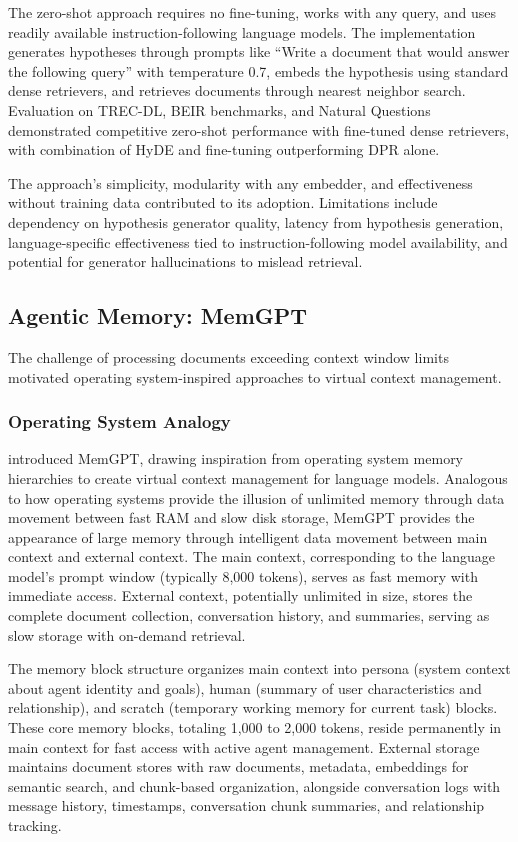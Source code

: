 \documentclass[11pt,letterpaper]{article}
\begin{document}
The zero-shot approach requires no fine-tuning, works with any query, and uses readily available instruction-following language models. The implementation generates hypotheses through prompts like ``Write a document that would answer the following query'' with temperature 0.7, embeds the hypothesis using standard dense retrievers, and retrieves documents through nearest neighbor search. Evaluation on TREC-DL, BEIR benchmarks, and Natural Questions demonstrated competitive zero-shot performance with fine-tuned dense retrievers, with combination of HyDE and fine-tuning outperforming DPR alone.

The approach's simplicity, modularity with any embedder, and effectiveness without training data contributed to its adoption. Limitations include dependency on hypothesis generator quality, latency from hypothesis generation, language-specific effectiveness tied to instruction-following model availability, and potential for generator hallucinations to mislead retrieval.

\subsection{Agentic Memory: MemGPT}

The challenge of processing documents exceeding context window limits motivated operating system-inspired approaches to virtual context management.

\subsubsection{Operating System Analogy}

\cite{packer2023memgpt} introduced MemGPT, drawing inspiration from operating system memory hierarchies to create virtual context management for language models. Analogous to how operating systems provide the illusion of unlimited memory through data movement between fast RAM and slow disk storage, MemGPT provides the appearance of large memory through intelligent data movement between main context and external context. The main context, corresponding to the language model's prompt window (typically 8,000 tokens), serves as fast memory with immediate access. External context, potentially unlimited in size, stores the complete document collection, conversation history, and summaries, serving as slow storage with on-demand retrieval.

The memory block structure organizes main context into persona (system context about agent identity and goals), human (summary of user characteristics and relationship), and scratch (temporary working memory for current task) blocks. These core memory blocks, totaling 1,000 to 2,000 tokens, reside permanently in main context for fast access with active agent management. External storage maintains document stores with raw documents, metadata, embeddings for semantic search, and chunk-based organization, alongside conversation logs with message history, timestamps, conversation chunk summaries, and relationship tracking.
\end{document}
